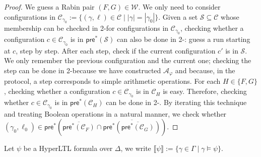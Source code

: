 \documentclass[10pt,a4paper]{article}
\newcommand{\set}[1]{\{#1\}}
\newcommand{\deff}{:=}
\newcommand{\config}{\gamma}
\newcommand{\configs}{\Gamma}
\newcommand{\preop}{\mathsf{pre}}
\newcommand{\prestar}[1]{\preop^*(#1)}
\newcommand{\transitions}{\Delta}
\newcommand{\satset}[1]{\llbracket {#1} \rrbracket}
\newcommand{\cSet}{\mathcal{S}}  %
\newcommand*{\buchiaut}{\mathcal{A}}
\newcommand*{\ltlaut}[1]{\buchiaut_{#1}}
\newcommand*{\abuchistate}{\ell}
\newcommand*{\bstate}{\abuchistate}
\newcommand*{\binitstate}{\bstate_0}
\newcommand*{\bwinning}{\mathcal{W}}
\newcommand{\prodconfigs}{\mathcal{C}}
\newcommand{\prodconfigsproj}[1]{\prodconfigs_{#1}}
\newcommand{\prodconfig}{c}
\newcommand*{\setcomplement}[1]{\overline{#1}}
\begin{document}
\begin{proof}
	We guess a Rabin pair \((F, G) \in \bwinning\).
	We only need to consider configurations in \(\prodconfigs_{\config_0} \deff \set{(\config, \bstate) \in \prodconfigs \mid |\config|=|\config_0| }\).
	Given a set \(\cSet \subseteq \prodconfigs\) whose membership can be checked in 2-\EXPSPACE for configurations in \(\prodconfigs_{\config_0}\), checking whether a configuration \(\prodconfig \in \prodconfigs_{\config_0}\) is in \(\prestar{\cSet}\) can also be done in 2-\EXPSPACE: guess a run starting at \(\prodconfig\), step by step.
	After each step, check if the current configuration \(\prodconfig'\) is in \(\cSet\).
	We only remember the previous configuration and the current one; checking the step can be done in 2-\EXPSPACE because we have constructed \(\ltlaut{\varphi}\) and because, in the protocol, a step corresponds to simple arithmetic operations.
	For each \(H\in\set{F,G}\), checking whether a configuration \(\prodconfig \in \prodconfigs_{\config_0}\) is in \(\prodconfigsproj{H}\) is easy.
	Therefore, checking whether \(\prodconfig \in \prodconfigs_{\config_0}\) is in \(\prestar{\prodconfigsproj{H}}\) can be done in 2-\EXPSPACE.
	By iterating this technique and treating Boolean operations in a natural manner, we check whether \((\config_0, \binitstate) \in \preop^* ( \setcomplement{\prestar{\prodconfigsproj{F}}} \cap \setcomplement{\prestar{\setcomplement{\prestar{\prodconfigsproj{G}}}}})\).

\end{proof}

Let \(\psi\) be a HyperLTL formula over \(\transitions\), we write \(\satset{\psi} \deff \set{\config \in \configs \mid \config \models \psi}\).
\end{document}
